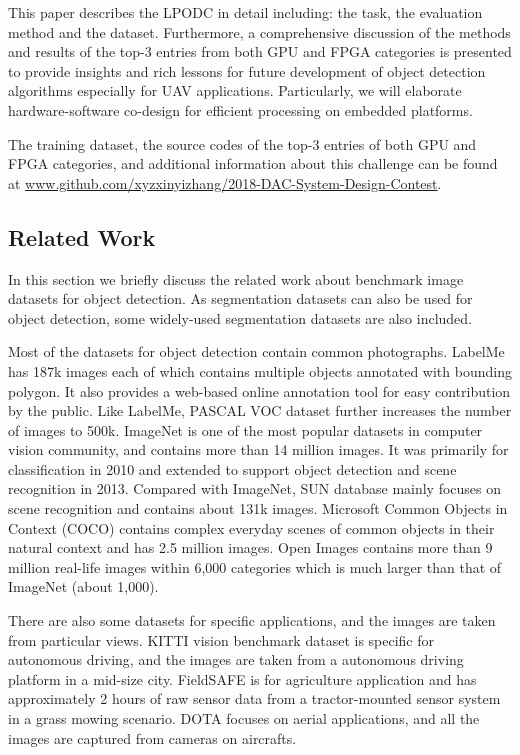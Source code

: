 \documentclass[10pt,journal,compsoc]{IEEEtran}
\begin{document}
This paper describes the LPODC in detail including: the task, the evaluation method and the dataset.
Furthermore, a comprehensive discussion of the methods and results of the top-3 entries from both GPU and FPGA categories is presented to provide insights and  rich lessons for future development of object detection algorithms especially for UAV applications.
Particularly, we will elaborate hardware-software co-design for efficient processing on embedded platforms.

The training dataset, the source codes of the top-3 entries of both GPU and FPGA categories, and additional information about this challenge can be found at \url{www.github.com/xyzxinyizhang/2018-DAC-System-Design-Contest}.

\subsection{Related Work}
In this section we briefly discuss the related work about benchmark image datasets for object detection.
As segmentation datasets can also be used for object detection, some widely-used segmentation datasets are also included.

Most of the datasets for object detection contain common photographs.
LabelMe \cite{russell2008labelme} has 187k images each of which contains multiple objects annotated with bounding polygon.
It also provides a web-based online annotation tool for easy contribution by the public.
Like LabelMe, PASCAL VOC dataset \cite{everingham2010pascal} further increases the number of images to 500k.
ImageNet \cite{russakovsky2015imagenet} is one of the most popular datasets in computer vision community, and contains more than 14 million images.
It was primarily for classification in 2010 and extended to support object detection and scene recognition in 2013.
Compared with ImageNet, SUN database \cite{xiao2010sun} mainly focuses on scene recognition and contains about 131k images.
Microsoft Common Objects in Context (COCO) \cite{lin2014microsoft} contains complex everyday scenes of common objects in their natural context and has 2.5 million images.
Open Images \cite{openimages} contains more than 9 million real-life images within 6,000 categories which is much larger than that of ImageNet (about 1,000).

There are also some datasets for specific applications, and the images are taken from particular views.
KITTI vision benchmark dataset \cite{Geiger2012CVPR} is specific for autonomous driving, and the images are taken from a autonomous driving platform in a mid-size city.
FieldSAFE \cite{kragh2017fieldsafe} is for agriculture application and has approximately 2 hours of raw sensor data from a tractor-mounted sensor system in a grass mowing scenario.
DOTA \cite{xia2018dota} focuses on aerial applications, and all the images are captured from cameras on aircrafts.
\end{document}
